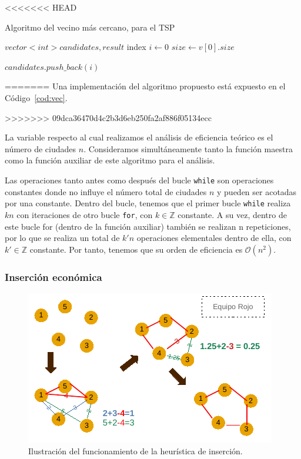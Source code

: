 <<<<<<< HEAD
\begin{algorithm}
    \caption{Algoritmo del vecino más cercano, para el TSP}\label{alg:vec_cercano}
    $vector<int> candidates,result$\;
    index\;
    $i \gets 0$\;
    $size \gets v[0].size$\;

    $candidates.push\_back(i)$\;

\end{algorithm}
=======
Una implementación del algoritmo propuesto está expuesto en el Código~\ref{cod:vec}. 


>>>>>>> 09dca36470d4c2b3d6eb250fa2af886f05134ecc


La variable respecto al cual realizamos el análisis de eficiencia teórico es el número
de ciudades $n$. Consideramos simultáneamente tanto la función maestra como la función
auxiliar de este algoritmo para el análisis. 

Las operaciones tanto antes como después del bucle \texttt{while} son operaciones constantes
donde no influye el número total de ciudades $n$ y pueden ser acotadas por una
constante. Dentro del bucle, tenemos que
el primer bucle  \texttt{while} realiza $kn$ con iteraciones de otro bucle \texttt{for}, con 
$k \in \mathbb Z$ constante. A su vez, dentro de este bucle for (dentro de la función auxiliar) 
también se realizan n repeticiones,
por lo que se realiza un total de $k'n$ operaciones elementales dentro de ella, 
con $k' \in \mathbb Z$ constante. Por tanto, tenemos que su orden de 
eficiencia es $\boxed{\mathcal O(n^2)}$. 

\subsubsection{Inserción económica}

\begin{figure}[H] 
  \centering
  \includegraphics[scale=1.5]{img/DibInsercion.pdf}
  \caption{Ilustración del funcionamiento de la heurística de inserción.}
  \label{fig:inser}
\end{figure}

